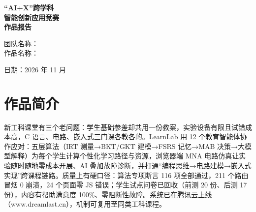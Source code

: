 \documentclass[zihao=-4,a4paper,UTF8,fontset=windows]{ctexart}
\begin{document}
\begin{titlepage}
\thispagestyle{cover}
\vspace*{2.8cm}
\begin{center}
{\bfseries{} “AI+X”跨学科}\\[0.8em]
{\bfseries{} 智能创新应用竞赛}\\[3em]
{\bfseries{} 作品报告}\\
\end{center}
\vspace{5em}
\begin{flushleft}
\hspace*{4em}
团队名称：\underline{}\\[0.8em]
\hspace*{4em}作品名称：\underline{}\\
\end{flushleft}
\vfill
\begin{center} 日期：2026 年 11 月\end{center}
\vspace*{1.5cm}
\end{titlepage}
\setcounter{page}{1}
\begingroup
{}
\renewcommand{\contentsname}{目\quad 录}
\setcounter{tocdepth}{3}
\tableofcontents
\endgroup
\newpage
\section*{作品简介}


新工科课堂有三个老问题：学生基础参差却共用一份教案，实验设备有限且试错成本高，C 语言、电路、嵌入式三门课各教各的。LearnLab 用 12 个教育智能体协作应对：五层算法（IRT 测量→BKT/GKT 建模→FSRS 记忆→MAB 决策→大模型解释）为每个学生计算个性化学习路径与资源，浏览器端 MNA 电路仿真让实验随时随地零成本开展、AI 叠加故障诊断，并打通“编程思维→电路建模→嵌入式实现”跨课程链路。质量上有硬口径：算法专项断言 116 项全部通过，211 个路由冒烟 0 崩溃，24 个页面零 JS 错误；学生试点问卷已回收（前测 20 份、后测 17 份），内容有帮助满意度 100\%、零阻断性故障。系统已在腾讯云上线（www.dreamlast.cn），机制可复用至同类工科课程。
\end{document}
